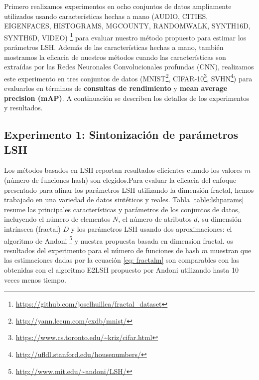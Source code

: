 Primero realizamos experimentos en ocho conjuntos de datos ampliamente utilizados usando características hechas a mano (AUDIO, CITIES, EIGENFACES, HISTOGRAMS, MGCOUNTY, RANDOMWALK, SYNTH16D, SYNTH6D, VIDEO) \footnote{\url{https://github.com/joselhuillca/fractal_dataset}} para evaluar nuestro método propuesto para estimar los parámetros LSH. Además de las características hechas a mano, también mostramos la eficacia de nuestros métodos cuando las características son extraídas por las Redes Neuronales Convolucionales profundas (CNN), realizamos este experimento en tres conjuntos de datos (MNIST\footnote{\url{http://yann.lecun.com/exdb/mnist/}}, CIFAR-10\footnote{\url{https://www.cs.toronto.edu/~kriz/cifar.html}}, SVHN\footnote{\url{http://ufldl.stanford.edu/housenumbers/}}) para evaluarlos en términos de \textbf{consultas de rendimiento} y \textbf{mean average precision (mAP)}. A continuación se describen los detalles de los experimentos y resultados.

\subsection{Experimento 1: Sintonización de parámetros LSH}

Los métodos basados en LSH reportan resultados eficientes cuando los valores $m$ (número de funciones hash) son elegidos.Para evaluar la eficacia del enfoque presentado para afinar los parámetros LSH utilizando la dimensión fractal, hemos trabajado en una variedad de datos sintéticos y reales. Tabla \ref{table:lshparams} resume las principales características y parámetros de los conjuntos de datos, incluyendo el número de elementos $N$, el número de atributos $d$, su dimensión intrínseca (fractal) $D$ y los parámetros LSH usando dos aproximaciones: el algoritmo de Andoni \footnote{\url{http://www.mit.edu/~andoni/LSH/}}  y nuestra propuesta basada en dimension fractal.  os resultados del experimento para el número de funciones de hash $m$ muestran que las estimaciones dadas por la ecuación \ref{eq: fractalm} son comparables con las obtenidas con el algoritmo E2LSH propuesto por Andoni utilizando hasta 10 veces menos tiempo.
 
